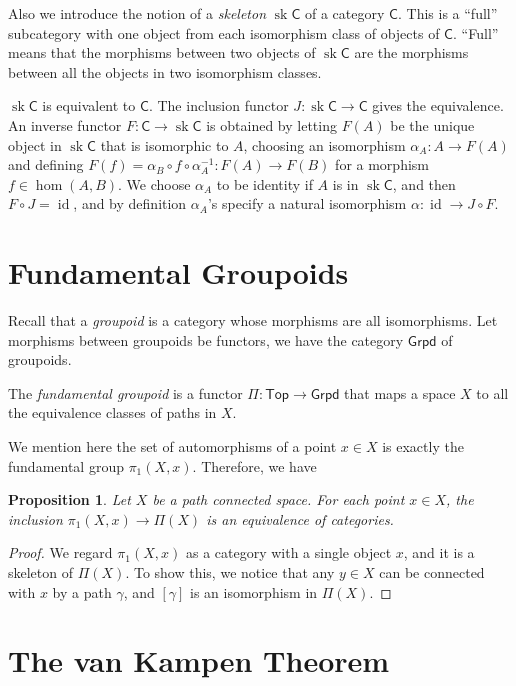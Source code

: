 \documentclass[a4paper]{amsart}
\theoremstyle{plain}
\newtheorem{prop}[thm]{Proposition}
\theoremstyle{definition}
\theoremstyle{remark}
\DeclareMathOperator{\sk}{sk}
\begin{document}
Also we introduce the notion of a \emph{skeleton} $\sk\mathsf{C}$ of a category $\mathsf{C}$.
This is a ``full'' subcategory with one object from each isomorphism class of objects of $\mathsf{C}$.
``Full'' means that the morphisms between two objects of $\sk\mathsf{C}$ are the morphisms between all the objects in two isomorphism classes.

$\sk\mathsf{C}$ is equivalent to $\mathsf{C}$.
The inclusion functor $J:\sk\mathsf{C}\to\mathsf{C}$ gives the equivalence.
An inverse functor $F:\mathsf{C}\to\sk\mathsf{C}$ is obtained by letting $F(A)$ be the unique object in $\sk\mathsf{C}$ that is isomorphic to $A$, choosing an isomorphism $\alpha_A:A\to F(A)$ and defining $F(f)=\alpha_B\circ f\circ \alpha_A^{-1}:F(A)\to F(B)$ for a morphism $f\in\hom(A,B)$.
We choose $\alpha_A$ to be identity if $A$ is in $\sk\mathsf{C}$, and then $F\circ J=\operatorname{id}$, and by definition $\alpha_A$'s specify a natural isomorphism $\alpha:\operatorname{id}\to J\circ F$.

\section{Fundamental Groupoids}
Recall that a \emph{groupoid} is a category whose morphisms are all isomorphisms.
Let morphisms between groupoids be functors, we have the category $\mathsf{Grpd}$ of groupoids.

The \emph{fundamental groupoid} is a functor $\Pi:\mathsf{Top}\to\mathsf{Grpd}$ that maps a space $X$ to all the equivalence classes of paths in $X$.

We mention here the set of automorphisms of a point $x\in X$ is exactly the fundamental group $\pi_1(X,x)$.
Therefore, we have
\begin{prop}
    Let $X$ be a path connected space.
    For each point $x\in X$, the inclusion $\pi_1(X,x)\to\Pi(X)$ is an equivalence of categories.
\end{prop}
\begin{proof}
    We regard $\pi_1(X,x)$ as a category with a single object $x$, and it is a skeleton of $\Pi(X)$.
    To show this, we notice that any $y\in X$ can be connected with $x$ by a path $\gamma$, and $[\gamma]$ is an isomorphism in $\Pi(X)$.
\end{proof}

\section{The van Kampen Theorem}
\end{document}
